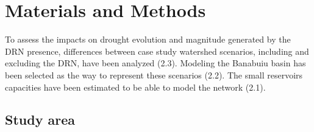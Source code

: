 \documentclass[draft]{agujournal2019}
\begin{document}
\section{Materials and Methods}
To assess the impacts on drought evolution and magnitude generated by the DRN presence, differences between case study watershed scenarios, including and excluding the DRN, have been analyzed (2.3). Modeling the Banabuiu basin has been selected as the way to represent these scenarios (2.2). The small reservoirs capacities have been estimated to be able to model the network (2.1).
\subsection{Study area}
\end{document}

